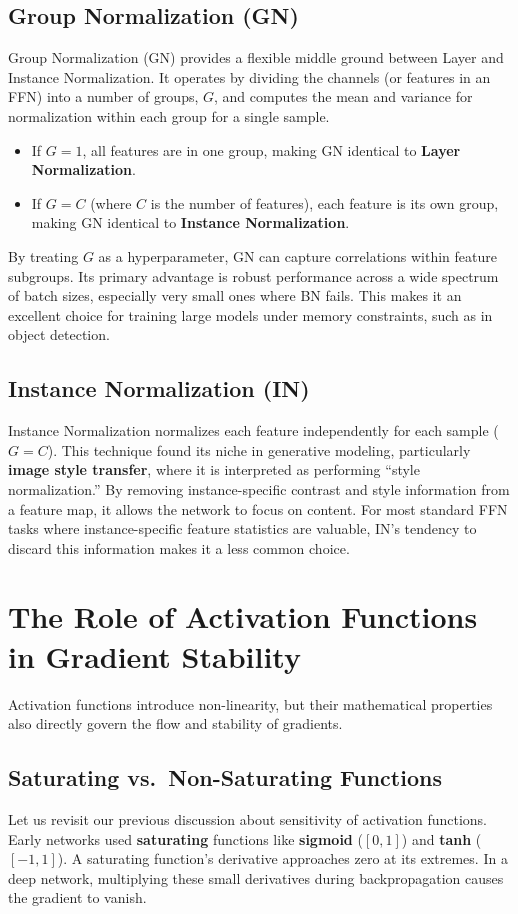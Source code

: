\documentclass{article}
\begin{document}
\subsection{Group Normalization (GN)}
Group Normalization (GN) provides a flexible middle ground between Layer and Instance Normalization. It operates by dividing the channels (or features in an FFN) into a number of groups, $G$, and computes the mean and variance for normalization within each group for a single sample.
\begin{itemize}
    \item If $G=1$, all features are in one group, making GN identical to \textbf{Layer Normalization}.
    \item If $G=C$ (where $C$ is the number of features), each feature is its own group, making GN identical to \textbf{Instance Normalization}.
\end{itemize}
By treating $G$ as a hyperparameter, GN can capture correlations within feature subgroups. Its primary advantage is robust performance across a wide spectrum of batch sizes, especially very small ones where BN fails. This makes it an excellent choice for training large models under memory constraints, such as in object detection.

\subsection{Instance Normalization (IN)}
Instance Normalization normalizes each feature independently for each sample ($G=C$). This technique found its niche in generative modeling, particularly \textbf{image style transfer}, where it is interpreted as performing ``style normalization.'' By removing instance-specific contrast and style information from a feature map, it allows the network to focus on content. For most standard FFN tasks where instance-specific feature statistics are valuable, IN's tendency to discard this information makes it a less common choice.

\section{The Role of Activation Functions in Gradient Stability}
Activation functions introduce non-linearity, but their mathematical properties also directly govern the flow and stability of gradients.

\subsection{Saturating vs.\ Non-Saturating Functions}
Let us revisit our previous discussion about sensitivity of activation functions. Early networks used \textbf{saturating} functions like \textbf{sigmoid} ($[0, 1]$) and \textbf{tanh} ($[-1, 1]$). A saturating function's derivative approaches zero at its extremes. In a deep network, multiplying these small derivatives during backpropagation causes the gradient to vanish.
\end{document}
